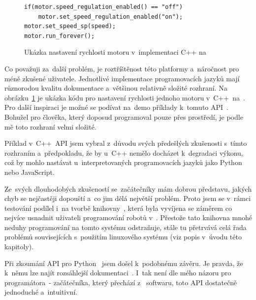 \begin{figure}[H] 
	\begin{verbatim}
if(motor.speed_regulation_enabled() == "off")
    motor.set_speed_regulation_enabled("on");
motor.set_speed_sp(speed);
motor.run_forever();
	\end{verbatim}
	\caption{Ukázka nastavení rychlosti motoru v~implementaci C++ na \evThreeDev}
	\label{src:ev3dev-lang-cpp_drive-test}
\end{figure}

Co považuji za~další problém, je roztříštěnost této platformy a~náročnost pro méně zkušené uživatele. 
Jednotlivé implementace programovacích jazyků mají různorodou kvalitu dokumentace a~většinou relativně složité rozhraní. 
Na obrázku~\ref{src:ev3dev-lang-cpp_drive-test} je ukázka kódu pro nastavení rychlosti jednoho motoru v~C++~na~\evThreeDev{}. 
Pro další inspiraci je možné se podívat na~demo příklady k~tomuto API~\cite{legoMindstormsEV3_ev3dev-lang-cpp_drive-test}.
Bohužel pro člověka, který doposud programoval pouze přes \lego{} prostředí, je podle mě toto rozhraní velmi složité.

Příklad v~C++~API jsem vybral z~důvodu svých předešlých zkušenosti s~tímto rozhraním a~předpokladu, že by u~C++ nemělo docházet k~degradaci výkonu, což by mohlo nastávat u~interpretovaných programovacích jazyků jako Python nebo JavaScript.

Ze~svých dlouhodobých zkušeností se~začátečníky mám dobrou představu, jakých chyb se nejčastěji dopouští a~co jim dělá největší problém.
Proto jsem se v~rámci testování \evThreeDev{} podílel i~na tvorbě knihovny~\cite{legoMindstormsEV3_ev3dev_RB-ev3dev-cpp-lib}, která byla vyvíjena se záměrem co nejvíce usnadnit uživateli programování robotů v~\evThreeDev{}. 
Přestože tato knihovna mnohé neduhy programování na tomto systému odstraňuje, stále tu přetrvává celá řada problémů souvisejících s~použitím linuxového systému (viz popis v~úvodu této kapitoly).


Při zkoumání API pro Python~\cite{legoMindstormsEV3_ev3dev-lang-python} jsem došel k~podobnému závěru. 
Je pravda, že k~němu lze najít rozsáhlejší dokumentaci~\cite{legoMindstormsEV3_ev3dev-lang-python-docs}. 
I~tak není dle mého názoru pro programátora~- začátečníka, který přechází z~\lego{}  softwaru, toto API dostatečně jednoduché a~intuitivní.


